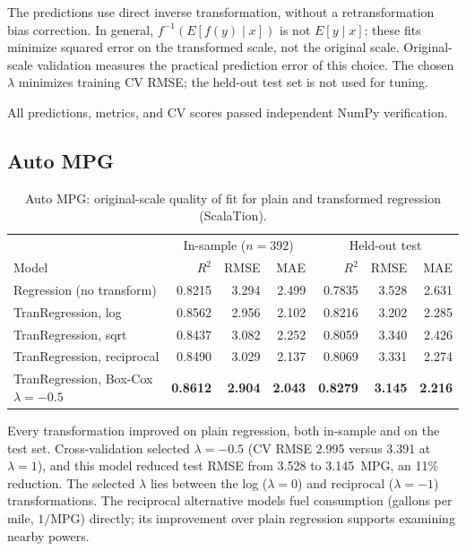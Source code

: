 The predictions use direct inverse transformation, without a retransformation bias correction. In general, $f^{-1}(E[f(y)\mid x])$ is not $E[y\mid x]$; these fits minimize squared error on the transformed scale, not the original scale. Original-scale validation measures the practical prediction error of this choice. The chosen $\lambda$ minimizes training CV RMSE; the held-out test set is not used for tuning.

All predictions, metrics, and CV scores passed independent NumPy verification.

\subsection{Auto MPG}

\begin{table}[H]
\centering
\small
\begin{tabular}{lrrr|rrr}
\toprule
 & \multicolumn{3}{c|}{In-sample ($n=392$)} & \multicolumn{3}{c}{Held-out test} \\
Model & $R^2$ & RMSE & MAE & $R^2$ & RMSE & MAE \\
\midrule
Regression (no transform)      & 0.8215 & 3.294 & 2.499 & 0.7835 & 3.528 & 2.631 \\
TranRegression, log            & 0.8562 & 2.956 & 2.102 & 0.8216 & 3.202 & 2.285 \\
TranRegression, sqrt           & 0.8437 & 3.082 & 2.252 & 0.8059 & 3.340 & 2.426 \\
TranRegression, reciprocal     & 0.8490 & 3.029 & 2.137 & 0.8069 & 3.331 & 2.274 \\
TranRegression, Box-Cox $\lambda=-0.5$ & \textbf{0.8612} & \textbf{2.904} & \textbf{2.043} & \textbf{0.8279} & \textbf{3.145} & \textbf{2.216} \\
\bottomrule
\end{tabular}
\caption{Auto MPG: original-scale quality of fit for plain and transformed regression (ScalaTion).}
\label{tab:tran_autompg}
\end{table}

Every transformation improved on plain regression, both in-sample and on the test set. Cross-validation selected $\lambda = -0.5$ (CV RMSE 2.995 versus 3.391 at $\lambda = 1$), and this model reduced test RMSE from 3.528 to 3.145~MPG, an 11\% reduction. The selected $\lambda$ lies between the log ($\lambda = 0$) and reciprocal ($\lambda = -1$) transformations. The reciprocal alternative models fuel consumption (gallons per mile, $1/\text{MPG}$) directly; its improvement over plain regression supports examining nearby powers.


